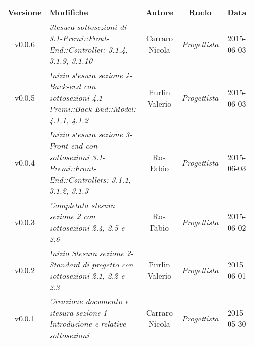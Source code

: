 \begin{table}[h]
	\centering
	\begin{tabular}{|c|p{}|c|c|c|}
		\toprule
			\textbf{Versione} & \textbf{Modifiche} & \textbf{Autore} & \textbf{Ruolo} & \textbf{Data}\\
		\midrule
		\midrule
			v0.0.6 & \textit{Stesura sottosezioni di 3.1-Premi::Front-End::Controller: 3.1.4, 3.1.9, 3.1.10} & Carraro Nicola & \textit{Progettista} & 2015-06-03\\
		\midrule
			v0.0.5 & \textit{Inizio stesura sezione 4-Back-end con sottosezioni 4.1-Premi::Back-End::Model: 4.1.1, 4.1.2} & Burlin Valerio & \textit{Progettista} & 2015-06-03\\
		\midrule
			v0.0.4 & \textit{Inizio stesura sezione 3-Front-end con sottosezioni 3.1-Premi::Front-End::Controllers: 3.1.1, 3.1.2, 3.1.3} & Ros Fabio & \textit{Progettista} & 2015-06-03\\
		\midrule
			v0.0.3 & \textit{Completata stesura sezione 2 con sottosezioni 2.4, 2.5 e 2.6} & Ros Fabio & \textit{Progettista} & 2015-06-02\\
		\midrule
			v0.0.2 & \textit{Inizio Stesura sezione 2-Standard di progetto con sottosezioni 2.1, 2.2 e 2.3} & Burlin Valerio & \textit{Progettista} & 2015-06-01\\
		\midrule
			v0.0.1 & \textit{Creazione documento e stesura sezione 1-Introduzione e relative sottosezioni} & Carraro Nicola & \textit{Progettista} & 2015-05-30\\
		\bottomrule
	\end{tabular}
\end{table}

\newpage